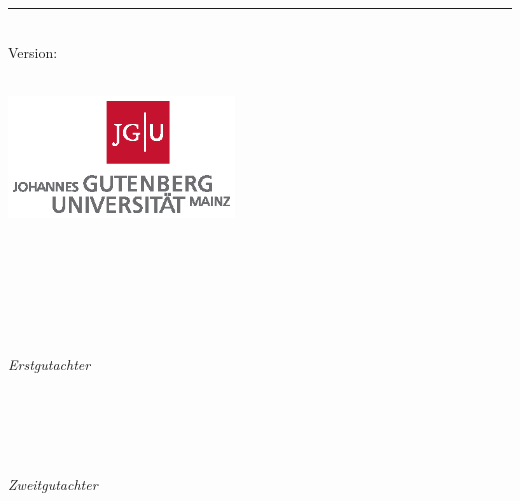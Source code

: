 \begin{titlepage}
	\flushright
	\hfill
	\vfill
	{\LARGE\thesisTitle \par}
	{\color{ctcolortitle}\rule[5pt]{\textwidth}{1pt} \par}
	{\Large\thesisName}
	\vfill
	\textit{\large\thesisDate} \\
	Version: \thesisVersion
\end{titlepage}


\begin{titlepage}
	\tgherosfont
	\centering

	{\Large \thesisUniversity} \\[4mm]
	\includegraphics[width=6cm]{gfx/jgu_logo_quad.eps} \\[2mm]
	\textsf{\thesisUniversityDepartment} \\
	\textsf{\thesisUniversityInstitute} \\
	\textsf{\thesisUniversityGroup} \\

	\vfill
	{\large \thesisSubject} \\[5mm]
	{\LARGE \color{ctcolortitle}\textbf{\thesisTitle} \\[10mm]}
	{\Large \thesisName} \\

	\vfill
	\begin{minipage}[t]{.27\textwidth}
		\raggedleft
		\textit{Erstgutachter}
	\end{minipage}
	\hspace*{15pt}
	\begin{minipage}[t]{.65\textwidth}
		{\Large \thesisReviewer} \\
	  	{\small \thesisReviewerDepartment} \\[-1mm]
		{\small \thesisReviewerUniversity}
	\end{minipage} \\[5mm]
	
	\begin{minipage}[t]{.27\textwidth}
		\raggedleft
		\textit{Zweitgutachter}
	\end{minipage}
	\hspace*{15pt}
	\begin{minipage}[t]{.65\textwidth}
		{\Large \thesisSupervisor} \\
	    {\small \thesisSupervisorDepartment} \\[-1mm]
		{\small \thesisSupervisorUniversity}
	\end{minipage} \\[10mm]


\end{titlepage}
